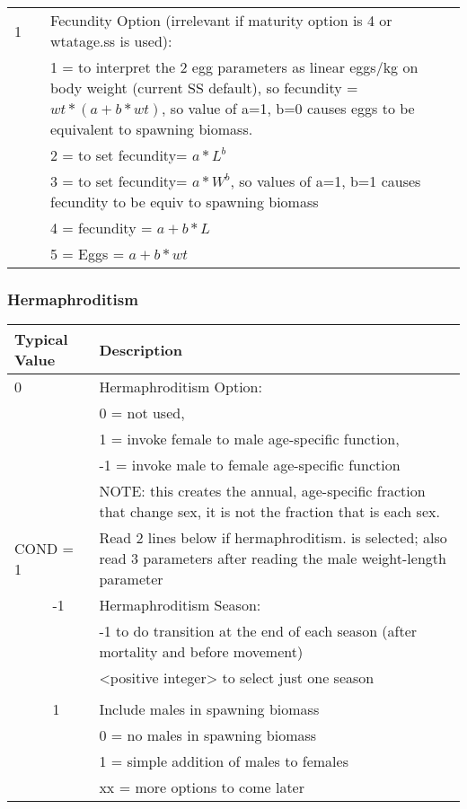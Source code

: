 \begin{longtable}{p{0.5cm} p{2cm} p{12cm}}
	   1 & & Fecundity Option (irrelevant if maturity option is 4 or wtatage.ss is used):\\
	     & & 1 = to  interpret the 2 egg parameters as linear eggs/kg on body weight (current SS default),  so fecundity = $wt * (a+b*wt)$, so value of a=1, b=0 causes eggs to be equivalent to spawning biomass.\\
	     & & 2 = to set fecundity= $a*L^ b$\\
	     & & 3 = to set fecundity= $a*W^ b$, so values of a=1, b=1 causes fecundity to be equiv to spawning biomass\\
	     & & 4 = fecundity = $a+b*L$\\
	     & & 5 = Eggs = $a+b*wt$\\
	  \hline
	\end{longtable}

\subsubsection{Hermaphroditism}


\begin{longtable}{p{0.5cm} p{2cm} p{12cm}}
	  \multicolumn{2}{l}{Typical Value} & Description \\
	  \hline
	  0 & & Hermaphroditism Option:\\
	   &  & 0 = not used, \\
	   &  & 1 = invoke female to male age-specific function, \\
	   &  & -1 = invoke male to female age-specific function \\
	   &  & NOTE:  this creates the annual, age-specific fraction that change sex, it is not the fraction that is each sex.\\
	  \hline

	  \multicolumn{2}{l}{COND = 1}& Read 2 lines below if hermaphroditism. is selected; also read 3 parameters after reading the male weight-length parameter\\
	  & -1 & Hermaphroditism Season: \\
	  &    & -1 to do transition at the end of each season (after mortality and before movement)\\
	  &    & <positive integer> to select just one season\\
	  \\
	  & 1  & Include males in spawning biomass \\
	  &    & 0 = no males in spawning biomass \\
	  &    & 1 = simple addition of males to females\\
	  &    & xx = more options to come later \\
	  \hline
	\end{longtable}

